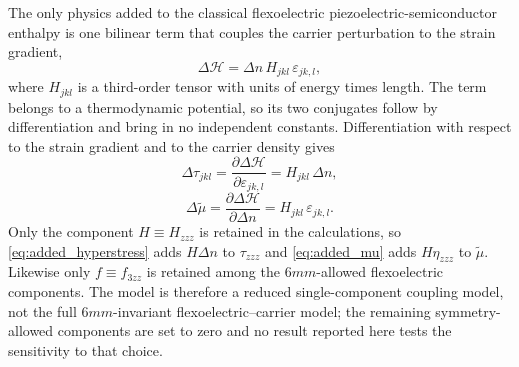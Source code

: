 The only physics added to the classical flexoelectric piezoelectric-semiconductor enthalpy is one bilinear term that couples the carrier perturbation to the strain gradient,
\begin{equation}
\label{eq:added_coupling}
\Delta\mathcal{H}=\Delta n\,H_{jkl}\,\varepsilon_{jk,l},
\end{equation}
where $H_{jkl}$ is a third-order tensor with units of energy times length.  The term belongs to a thermodynamic potential, so its two conjugates follow by differentiation and bring in no independent constants.  Differentiation with respect to the strain gradient and to the carrier density gives
\begin{equation}
\label{eq:added_hyperstress}
\Delta\tau_{jkl}=\frac{\partial\Delta\mathcal{H}}{\partial\varepsilon_{jk,l}}=H_{jkl}\,\Delta n ,
\end{equation}
\begin{equation}
\label{eq:added_mu}
\Delta\widetilde\mu=\frac{\partial\Delta\mathcal{H}}{\partial\Delta n}=H_{jkl}\,\varepsilon_{jk,l} .
\end{equation}
Only the component $H\equiv H_{zzz}$ is retained in the calculations, so \eqref{eq:added_hyperstress} adds $H\Delta n$ to $\tau_{zzz}$ and \eqref{eq:added_mu} adds $H\eta_{zzz}$ to $\widetilde\mu$.  Likewise only $f\equiv f_{3zz}$ is retained among the $6mm$-allowed flexoelectric components.  The model is therefore a reduced single-component coupling model, not the full $6mm$-invariant flexoelectric--carrier model; the remaining symmetry-allowed components are set to zero and no result reported here tests the sensitivity to that choice.

